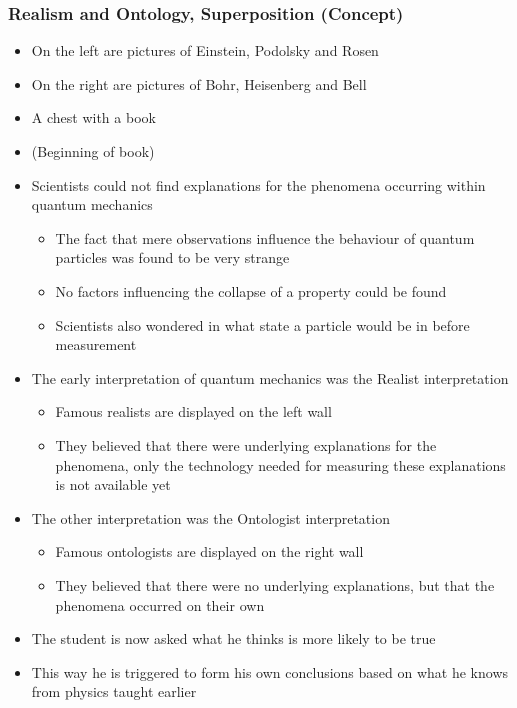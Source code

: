 \documentclass[11pt,twoside]{report} %
\begin{document}
\subsubsection{Realism and Ontology, Superposition (Concept)}
\begin{itemize}
	\item On the left are pictures of Einstein, Podolsky and Rosen
	\item On the right are pictures of Bohr, Heisenberg and Bell
	\item A chest with a book
	\item (Beginning of book)
	\item Scientists could not find explanations for the phenomena occurring within quantum mechanics
	\begin{itemize}
		\item The fact that mere observations influence the behaviour of quantum particles was found to be very strange
		\item No factors influencing the collapse of a property could be found
		\item Scientists also wondered in what state a particle would be in before measurement
	\end{itemize}
	\item The early interpretation of quantum mechanics was the Realist interpretation
	\begin{itemize}
		\item Famous realists are displayed on the left wall
		\item They believed that there were underlying explanations for the phenomena, only the technology needed for measuring these explanations is not available yet
	\end{itemize}
	\item The other interpretation was the Ontologist interpretation
	\begin{itemize}
		\item Famous ontologists are displayed on the right wall
		\item They believed that there were no underlying explanations, but that the phenomena occurred on their own
	\end{itemize}
	\item The student is now asked what he thinks is more likely to be true
	\item This way he is triggered to form his own conclusions based on what he knows from physics taught earlier
\end{itemize}
\end{document}
